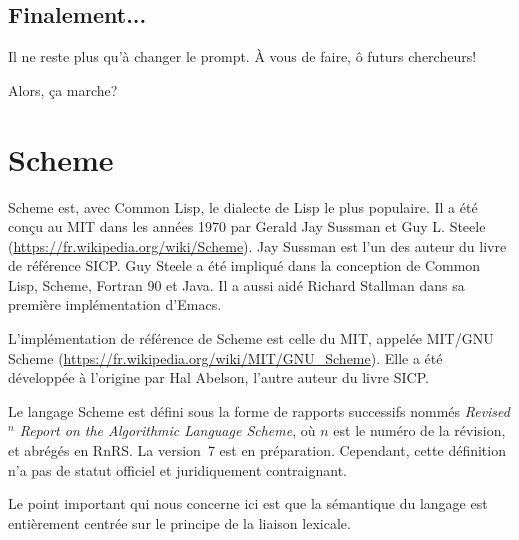 \documentclass{../../LaTeX/tdsimple}
\begin{document}
\subsection{Finalement...}

Il ne reste plus qu'à changer le prompt. À vous de faire, ô futurs
chercheurs!

\begin{attention}
  Alors, ça marche?~\smiley
\end{attention}

\section{Scheme}

Scheme est, avec Common Lisp, le dialecte de Lisp le plus
populaire. Il a été conçu au MIT dans les années 1970 par Gerald Jay
Sussman et Guy L. Steele
(\url{https://fr.wikipedia.org/wiki/Scheme}). Jay Sussman est l'un des
auteur du livre de référence SICP. Guy Steele a été impliqué dans la
conception de Common Lisp, Scheme, Fortran 90 et Java. Il a aussi
aidé Richard Stallman dans sa première implémentation d'Emacs.

L'implémentation de référence de Scheme est celle du MIT, appelée
MIT/GNU Scheme
(\url{https://fr.wikipedia.org/wiki/MIT/GNU_Scheme}). Elle a été
développée à l'origine par Hal Abelson, l'autre auteur du livre SICP.

\begin{attention}
  Le langage Scheme est défini sous la forme de rapports successifs
  nommés \emph{Revised${}^n$ Report on the Algorithmic Language
    Scheme}, où $n$ est le numéro de la révision, et abrégés en
  RnRS. La version~7 est en préparation. Cependant, cette définition
  n'a pas de statut officiel et juridiquement contraignant.
\end{attention}

Le point important qui nous concerne ici est que la sémantique du
langage est entièrement centrée sur le principe de la liaison
lexicale.
\end{document}
